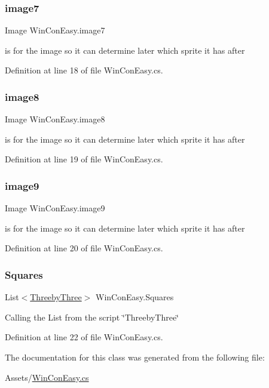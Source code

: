 \subsubsection{\texorpdfstring{image7}{image7}}
{\footnotesize\ttfamily Image Win\+Con\+Easy.\+image7}

is for the image so it can determine later which sprite it has after 

Definition at line 18 of file Win\+Con\+Easy.\+cs.

\mbox{\label{class_win_con_easy_a28af7c9f0a88c29d3c4b533c292e8a5f}} 
\subsubsection{\texorpdfstring{image8}{image8}}
{\footnotesize\ttfamily Image Win\+Con\+Easy.\+image8}

is for the image so it can determine later which sprite it has after 

Definition at line 19 of file Win\+Con\+Easy.\+cs.

\mbox{\label{class_win_con_easy_a151d80044f369798d5d6815638419d87}} 
\subsubsection{\texorpdfstring{image9}{image9}}
{\footnotesize\ttfamily Image Win\+Con\+Easy.\+image9}

is for the image so it can determine later which sprite it has after 

Definition at line 20 of file Win\+Con\+Easy.\+cs.

\mbox{\label{class_win_con_easy_a019dbd53b02d223d6c56059339a1627c}} 
\subsubsection{\texorpdfstring{Squares}{Squares}}
{\footnotesize\ttfamily List$<$\mbox{\hyperlink{class_threeby_three}{Threeby\+Three}}$>$ Win\+Con\+Easy.\+Squares}

Calling the List from the script \char`\"{}\+Threeby\+Three\char`\"{} 

Definition at line 22 of file Win\+Con\+Easy.\+cs.



The documentation for this class was generated from the following file\+:\begin{DoxyCompactItemize}
\item 
Assets/\mbox{\hyperlink{_win_con_easy_8cs}{Win\+Con\+Easy.\+cs}}\end{DoxyCompactItemize}
